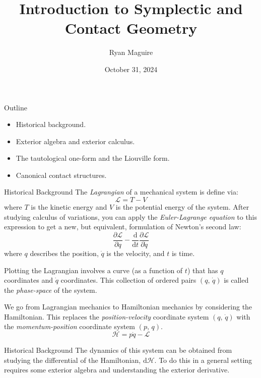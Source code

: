 \documentclass{beamer}
\title{Introduction to Symplectic and Contact Geometry}
\author{Ryan Maguire}
\date{October 31, 2024}
\begin{document}
    \maketitle
    \begin{frame}{Outline}
        \begin{itemize}
            \item Historical background.
            \item Exterior algebra and exterior calculus.
            \item The tautological one-form and the Liouville form.
            \item Canonical contact structures.
        \end{itemize}
    \end{frame}
    \begin{frame}{Historical Background}
        The \textit{Lagrangian} of a mechanical system is define via:
        \[
            \mathcal{L}=T-V
        \]
        where $T$ is the kinetic energy and $V$ is the potential energy of the
        system. After studying calculus of variations, you can apply the
        \textit{Euler-Lagrange equation} to this expression to get a new, but
        equivalent, formulation of Newton's second law:
        \[
            \frac{\partial\mathcal{L}}{\partial{q}}
            -\frac{\textrm{d}}{\textrm{d}t}
            \frac{\partial\mathcal{L}}{\partial\dot{q}}
        \]
        where $q$ describes the position, $\dot{q}$ is the velocity,
        and $t$ is time.
    \end{frame}
    \begin{frame}
        Plotting the Lagrangian involves a curve (as a function of $t$)
        that has $q$ coordinates and $\dot{q}$ coordinates. This collection of
        ordered pairs $(q,\,\dot{q})$ is called the \textit{phase-space} of the
        system.
        \par\hfill\par
        We go from Lagrangian mechanics to Hamiltonian mechanics by considering
        the Hamiltonian. This replaces the \textit{position-velocity} coordinate
        system $(q,\,\dot{q})$ with the \textit{momentum-position} coordinate
        system $(p,\,q)$.
        \[
            \mathcal{H}
            =p\dot{q}-\mathcal{L}
        \]
    \end{frame}
    \begin{frame}{Historical Background}
        The dynamics of this system can be obtained
        from studying the differential
        of the Hamiltonian, $\textrm{d}\mathcal{H}$. To do this in a general
        setting requires some exterior algebra and understanding the exterior
        derivative.
    \end{frame}
\end{document}
